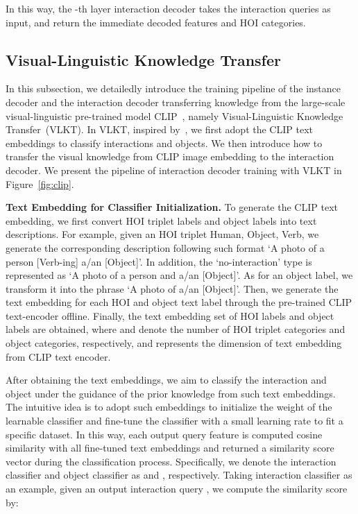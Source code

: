 \documentclass[10pt,twocolumn,letterpaper]{article}
\begin{document}
In this way, the -th layer interaction decoder takes the interaction queries   as input, and return the immediate decoded features  and HOI categories.



\vspace{-1mm}\subsection{Visual-Linguistic Knowledge Transfer}\label{sec:clip}\vspace{-1mm}
In this subsection, we detailedly introduce the training pipeline of the instance decoder and the interaction decoder transferring knowledge from the large-scale visual-linguistic pre-trained model CLIP~\cite{radford2021learning}, namely Visual-Linguistic Knowledge Transfer~(VLKT). In VLKT, inspired by~\cite{jin2021object,gu2021open}, we first adopt the CLIP text embeddings to classify interactions and objects.
 We then introduce how to transfer the visual knowledge from CLIP image embedding to the interaction decoder. We present the pipeline of interaction decoder training with VLKT in Figure~\ref{fig:clip}.

\vspace{1mm}\noindent\textbf{Text Embedding for Classifier Initialization.} To generate the CLIP text embedding, we first convert HOI triplet labels and object labels into text descriptions. For example, given an HOI triplet Human, Object, Verb, we generate the corresponding description following such format `A photo of a person [Verb-ing] a/an [Object]'. In addition, the `no-interaction' type is represented as `A photo of a person and a/an [Object]'. As for an object label, we transform it into the phrase `A photo of a/an [Object]'. Then, we generate the text embedding for each HOI and object text label through the pre-trained CLIP text-encoder offline. Finally, the text embedding set of HOI labels  and object labels  are obtained, where  and  denote the number of HOI triplet categories and object categories, respectively, and  represents the dimension of text embedding from CLIP text encoder.

After obtaining the text embeddings, we aim to classify the interaction and object under the guidance of the prior knowledge from such text embeddings. The intuitive idea is to adopt such embeddings to initialize the weight of the learnable classifier and fine-tune the classifier with a small learning rate to fit a specific dataset. In this way,  each output query feature is computed cosine similarity with all fine-tuned text embeddings and returned a similarity score vector during the classification process. Specifically, we denote the interaction classifier and object classifier as  and , respectively. Taking interaction classifier  as an example, given an output interaction query , we compute the similarity score by:
\end{document}
